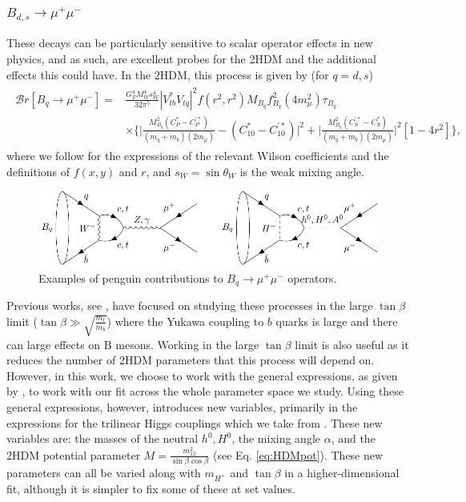 \documentclass[a4paper,12pt]{article}
\begin{document}
\subsubsection{$B_{d,s}\to\mu^+\mu^-$}
These decays can be particularly sensitive to scalar operator effects in new physics, and as such, are excellent probes for the 2HDM and the additional effects this could have. 
In the 2HDM, this process is given by (for $q=d,s$)
\begin{align}
    \begin{split}
        \mathcal{B}r[B_{q}\to\mu^+\mu^-] = &\frac{G^4_FM_W^4s_W^4}{32\pi^5}|V_{tb}^*V_{tq}|^2f(r^2,r^2)M_{B_q}f_{B_q}^2(4m_\mu^2)\tau_{B_q} \\
                                           &\times\Bigg\{\bigg|\frac{M_{B_q}^2(C_P^*-C_P^{'*})}{(m_q+m_b)(2m_\mu)}-(C_{10}^*-C_{10}^{'*})\bigg|^2 +\bigg|\frac{M_{B_q}^2(C_S^{'*}-C_S^*)}{(m_q+m_b)(2m_\mu)}\bigg|^2\left[1-4r^2\right]\Bigg\},
    \end{split}
\end{align}
where we follow \cite{criv} for the expressions of the relevant Wilson coefficients and the definitions of $f(x,y)$ and $r$, and $s_W=\sin\theta_W$ is the weak mixing angle. 
\begin{figure}[H]
    \centering
    \includegraphics[width=\textwidth]{bsmu.pdf}
    \caption{\label{fig:bspeng}Examples of penguin contributions to $B_q\to\mu^+\mu^-$ operators.}
\end{figure}
Previous works, see \cite{lrgtb}, have focused on studying these processes in the large $\tan\beta$ limit ($\tan\beta\gg\sqrt{\frac{m_t}{m_b}}$) where the Yukawa coupling to $b$ quarks is large and there can large effects on B mesons. 
Working in the large $\tan\beta$ limit is also useful as it reduces the number of 2HDM parameters that this process will depend on. 
However, in this work, we choose to work with the general expressions, as given by \cite{criv}, to work with our fit across the whole parameter space we study. 
Using these general expressions, however, introduces new variables, primarily in the expressions for the trilinear Higgs couplings which we take from \cite{trilin}.
These new variables are: the masses of the neutral $h^0,H^0$, the mixing angle $\alpha$, and the 2HDM potential parameter $M=\frac{m_{12}^2}{\sin\beta\cos\beta}$ (see Eq. \ref{eq:HDMpot}). 
These new parameters can all be varied along with $m_{H^+}$ and $\tan\beta$ in a higher-dimensional fit, although it is simpler to fix some of these at set values. 
\end{document}
